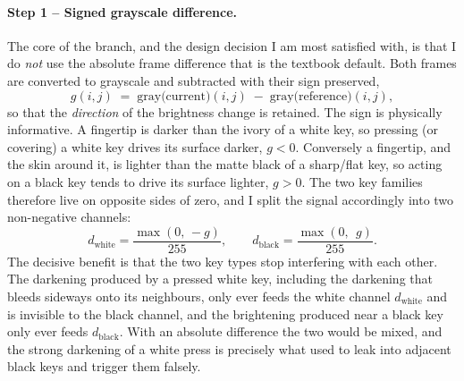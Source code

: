 \documentclass[11pt]{article}
\begin{document}
\paragraph{Step 1 -- Signed grayscale difference.}
The core of the branch, and the design decision I am most satisfied with, is that
I do \emph{not} use the absolute frame difference that is the textbook default.
Both frames are converted to grayscale and subtracted with their sign preserved,
\begin{equation}
  g(i,j) \;=\; \text{gray}\big(\text{current}\big)(i,j)
            \;-\; \text{gray}\big(\text{reference}\big)(i,j),
  \label{eq:signeddiff}
\end{equation}
so that the \emph{direction} of the brightness change is retained. The sign is
physically informative. A fingertip is darker than the ivory of a white key, so
pressing (or covering) a white key drives its surface darker, $g<0$. Conversely a
fingertip, and the skin around it, is lighter than the matte black of a sharp/flat
key, so acting on a black key tends to drive its surface lighter, $g>0$. The two
key families therefore live on opposite sides of zero, and I split the signal
accordingly into two non-negative channels:
\begin{equation}
  d_{\text{white}} = \frac{\max(0,\,-g)}{255}, \qquad
  d_{\text{black}} = \frac{\max(0,\;\,g)}{255}.
  \label{eq:twochannels}
\end{equation}
The decisive benefit is that the two key types stop interfering with each other.
The darkening produced by a pressed white key, including the darkening that bleeds
sideways onto its neighbours, only ever feeds the white channel $d_{\text{white}}$
and is invisible to the black channel, and the brightening produced near a black
key only ever feeds $d_{\text{black}}$. With an absolute difference the two would
be mixed, and the strong darkening of a white press is precisely what used to leak
into adjacent black keys and trigger them falsely.
\end{document}
